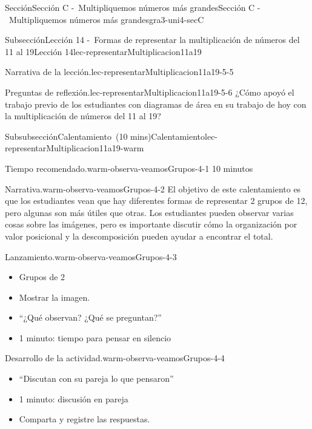 \documentclass[oneside,10pt,]{article}
\begin{document}
\begin{sectionptx}{Sección}{Sección C -~Multipliquemos números más grandes}{}{Sección C -~Multipliquemos números más grandes}{}{}{gra3-uni4-secC}
\begin{subsectionptx}{Subsección}{Lección 14 -~Formas de representar la multiplicación de números del 11 al 19}{}{Lección 14}{}{}{lec-representarMultiplicacion11a19}
\begin{introduction}{}
\begin{paragraphs}{Narrativa de la lección.}{lec-representarMultiplicacion11a19-5-5}
\end{paragraphs}%
\begin{paragraphs}{Preguntas de reflexión.}{lec-representarMultiplicacion11a19-5-6}%
¿Cómo apoyó el trabajo previo de los estudiantes con diagramas de área en su trabajo de hoy con la multiplicación de números del 11 al 19?%
\end{paragraphs}%
\end{introduction}%
%
%
\typeout{************************************************}
\typeout{************************************************}
%
\begin{subsubsectionptx}{Subsubsección}{Calentamiento~(10 mins)}{}{Calentamiento}{}{}{lec-representarMultiplicacion11a19-warm}
\par
\begin{paragraphs}{Tiempo recomendado.}{warm-observa-veamosGrupos-4-1}%
10 minutos%
\end{paragraphs}%
\begin{paragraphs}{Narrativa.}{warm-observa-veamosGrupos-4-2}%
El objetivo de este calentamiento es que los estudiantes vean que hay diferentes formas de representar 2 grupos de 12, pero algunas son más útiles que otras. Los estudiantes pueden observar varias cosas sobre las imágenes, pero es importante discutir cómo la organización por valor posicional y la descomposición pueden ayudar a encontrar el total.%
\end{paragraphs}%
\begin{paragraphs}{Lanzamiento.}{warm-observa-veamosGrupos-4-3}%
%
\begin{itemize}[label=\textbullet]
\item{}Grupos de 2%
\item{}Mostrar la imagen.%
\item{}``¿Qué observan? ¿Qué se preguntan?''%
\item{}1 minuto: tiempo para pensar en silencio%
\end{itemize}
\end{paragraphs}%
\begin{paragraphs}{Desarrollo de la actividad.}{warm-observa-veamosGrupos-4-4}%
%
\begin{itemize}[label=\textbullet]
\item{}``Discutan con su pareja lo que pensaron''%
\item{}1 minuto: discusión en pareja%
\item{}Comparta y registre las respuestas.%
\end{itemize}

\end{paragraphs}
\end{subsubsectionptx}
\end{subsectionptx}
\end{sectionptx}
\end{document}
